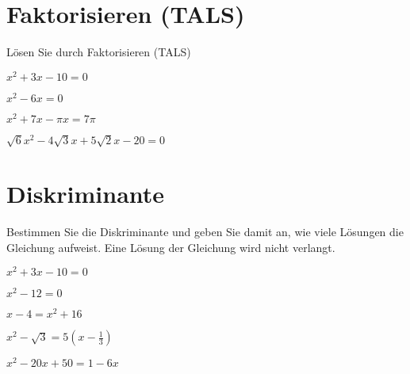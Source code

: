 \section{Faktorisieren (TALS)}
Lösen Sie durch Faktorisieren (TALS)

\begin{bbwAufgabenBlock}
\item $ x^2 + 3x - 10= 0$

\item $ x^2 - 6x= 0$

\item $ x^2 + 7x -\pi x= 7\pi$

\item $ \sqrt{6}x^2 - 4\sqrt{3}x + 5\sqrt{2}x - 20= 0$


\end{bbwAufgabenBlock}
\newpage



\section{Diskriminante}
Bestimmen Sie die Diskriminante und geben Sie damit an, wie viele
Lösungen die Gleichung aufweist. Eine Lösung der Gleichung wird nicht
verlangt.


\begin{bbwAufgabenBlock}
\item $ x^2 + 3x - 10= 0$

\item $ x^2 - 12= 0$

\item $ x-4= x^2 + 16$

\item $ x^2 - \sqrt{3} = 5(x-\frac13)$

\item $ x^2 - 20x + 50 = 1 - 6x$




\end{bbwAufgabenBlock}
\newpage



